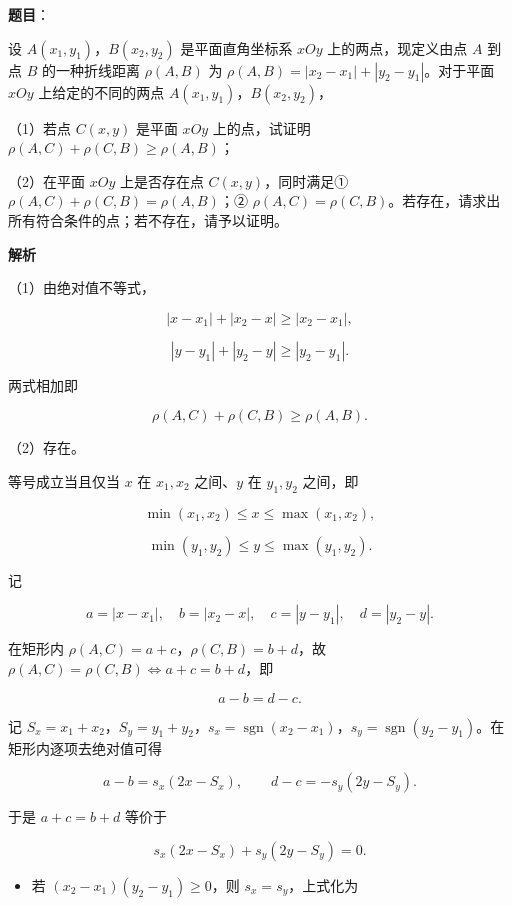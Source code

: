 \begin{answer}

\textbf{题目}：

设 $A(x_1,y_1)$，$B(x_2,y_2)$ 是平面直角坐标系 $xOy$ 上的两点，现定义由点 $A$ 到点 $B$ 的一种折线距离 $\rho(A,B)$ 为 $\rho(A,B)=|x_2-x_1|+|y_2-y_1|$。对于平面 $xOy$ 上给定的不同的两点 $A(x_1,y_1)$，$B(x_2,y_2)$，

（1）若点 $C(x,y)$ 是平面 $xOy$ 上的点，试证明 $\rho(A,C)+\rho(C,B)\geqslant\rho(A,B)$；

（2）在平面 $xOy$ 上是否存在点 $C(x,y)$，同时满足① $\rho(A,C)+\rho(C,B)=\rho(A,B)$；② $\rho(A,C)=\rho(C,B)$。若存在，请求出所有符合条件的点；若不存在，请予以证明。

\textbf{解析}

（1）由绝对值不等式，

\nopagebreak[4]
\[|x-x_1|+|x_2-x|\geqslant|x_2-x_1|,\]

\nopagebreak[4]
\[|y-y_1|+|y_2-y|\geqslant|y_2-y_1|.\]

两式相加即

\nopagebreak[4]
\[\rho(A,C)+\rho(C,B)\geqslant\rho(A,B).\]

（2）存在。

等号成立当且仅当 $x$ 在 $x_1,x_2$ 之间、$y$ 在 $y_1,y_2$ 之间，即

\nopagebreak[4]
\[\min(x_1,x_2)\leqslant x\leqslant\max(x_1,x_2),\]

\nopagebreak[4]
\[\min(y_1,y_2)\leqslant y\leqslant\max(y_1,y_2).\]

记

\nopagebreak[4]
\[a=|x-x_1|,\quad b=|x_2-x|,\quad c=|y-y_1|,\quad d=|y_2-y|.\]

在矩形内 $\rho(A,C)=a+c$，$\rho(C,B)=b+d$，故 $\rho(A,C)=\rho(C,B)\iff a+c=b+d$，即

\nopagebreak[4]
\[a-b=d-c.\]

记 $S_x=x_1+x_2$，$S_y=y_1+y_2$，$s_x=\operatorname{sgn}(x_2-x_1)$，$s_y=\operatorname{sgn}(y_2-y_1)$。在矩形内逐项去绝对值可得

\nopagebreak[4]
\[a-b=s_x(2x-S_x),\qquad d-c=-s_y(2y-S_y).\]

于是 $a+c=b+d$ 等价于

\nopagebreak[4]
\[s_x(2x-S_x)+s_y(2y-S_y)=0.\]

\begin{itemize}
\item 若 $(x_2-x_1)(y_2-y_1)\geqslant0$，则 $s_x=s_y$，上式化为
\end{itemize}


\end{answer}
